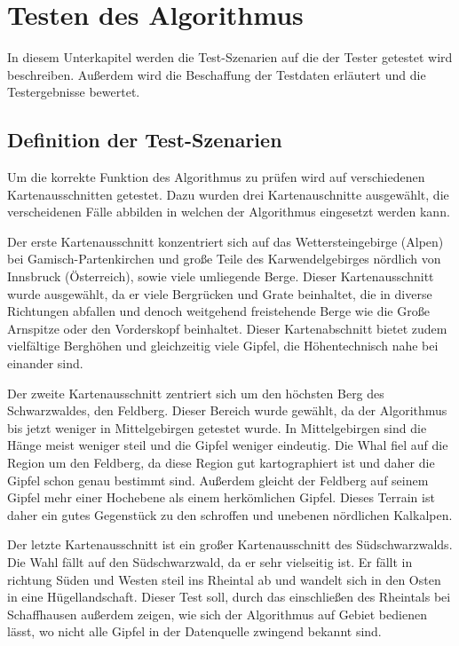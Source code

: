 \section{Testen des Algorithmus}
In diesem Unterkapitel werden die Test-Szenarien auf die der Tester getestet wird beschreiben. Außerdem wird die Beschaffung der Testdaten erläutert und die Testergebnisse bewertet. 

\subsection{Definition der Test-Szenarien}
Um die korrekte Funktion des Algorithmus zu prüfen wird auf verschiedenen Kartenausschnitten getestet. Dazu wurden drei Kartenauschnitte ausgewählt, die verscheidenen Fälle abbilden in welchen der Algorithmus eingesetzt werden kann. 


Der erste Kartenausschnitt konzentriert sich auf das Wettersteingebirge (Alpen) bei Gamisch-Partenkirchen und große Teile des Karwendelgebirges nördlich von Innsbruck (Österreich), sowie viele umliegende Berge. Dieser Kartenausschnitt wurde ausgewählt, da er viele Bergrücken und Grate beinhaltet, die in diverse Richtungen abfallen und denoch weitgehend freistehende Berge wie die Große Arnspitze oder den Vorderskopf beinhaltet. Dieser Kartenabschnitt bietet zudem vielfältige Berghöhen und gleichzeitig viele Gipfel, die Höhentechnisch nahe bei einander sind.  


Der zweite Kartenausschnitt zentriert sich um den höchsten Berg des Schwarzwaldes, den Feldberg. Dieser Bereich wurde gewählt, da der Algorithmus bis jetzt weniger in Mittelgebirgen getestet wurde. In Mittelgebirgen sind die Hänge meist weniger steil und die Gipfel weniger eindeutig. Die Whal fiel auf die Region um den Feldberg, da diese Region gut kartographiert ist und daher die Gipfel schon genau bestimmt sind. Außerdem gleicht der Feldberg auf seinem Gipfel mehr einer Hochebene als einem herkömlichen Gipfel. Dieses Terrain ist daher ein gutes Gegenstück zu den schroffen und unebenen nördlichen Kalkalpen.  


Der letzte Kartenausschnitt ist ein großer Kartenausschnitt des Südschwarzwalds. Die Wahl fällt auf den Südschwarzwald, da er sehr vielseitig ist. Er fällt in richtung Süden und Westen steil ins Rheintal ab und wandelt sich in den Osten in eine Hügellandschaft. Dieser Test soll, durch das einschließen des Rheintals bei Schaffhausen außerdem zeigen, wie sich der Algorithmus auf Gebiet bedienen lässt, wo nicht alle Gipfel in der Datenquelle zwingend bekannt sind.


